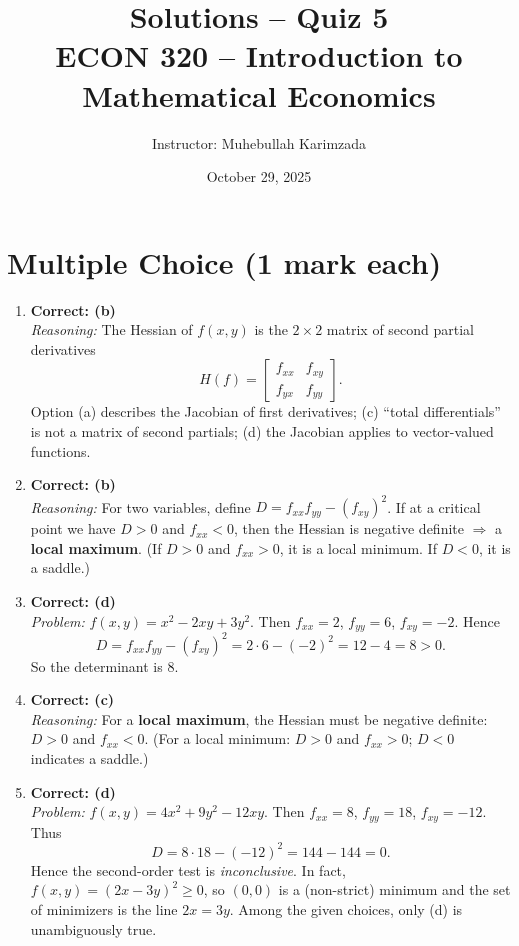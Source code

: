 \documentclass[12pt]{article}
\title{Solutions -- Quiz 5\\ \vspace{5pt}
\large ECON 320 -- Introduction to Mathematical Economics}
\author{Instructor: Muhebullah Karimzada}
\date{October 29, 2025}
\begin{document}
\maketitle

\section*{{ Multiple Choice (1 mark each)}}

\begin{enumerate}[leftmargin=*, label=\textbf{Q\arabic*.}]

\item \textbf{Correct: (b)} \\
\emph{Reasoning:} The Hessian of $f(x,y)$ is the $2\times 2$ matrix of second partial derivatives
\[
H(f)=
\begin{bmatrix}
f_{xx} & f_{xy}\\
f_{yx} & f_{yy}
\end{bmatrix}.
\]
Option (a) describes the Jacobian of first derivatives; (c) ``total differentials'' is not a matrix of second partials; (d) the Jacobian applies to vector-valued functions.

\item \textbf{Correct: (b)} \\
\emph{Reasoning:} For two variables, define $D=f_{xx}f_{yy}-(f_{xy})^2$. If at a critical point we have $D>0$ and $f_{xx}<0$, then the Hessian is negative definite $\Rightarrow$ a \textbf{local maximum}. (If $D>0$ and $f_{xx}>0$, it is a local minimum. If $D<0$, it is a saddle.)

\item \textbf{Correct: (d)} \\
\emph{Problem:} $f(x,y)=x^2-2xy+3y^2$. Then $f_{xx}=2$, $f_{yy}=6$, $f_{xy}=-2$. Hence
\[
D = f_{xx}f_{yy}-(f_{xy})^2 = 2\cdot 6 - (-2)^2 = 12-4=8>0.
\]
So the determinant is $8$.

\item \textbf{Correct: (c)} \\
\emph{Reasoning:} For a \textbf{local maximum}, the Hessian must be negative definite: $D>0$ and $f_{xx}<0$. (For a local minimum: $D>0$ and $f_{xx}>0$; $D<0$ indicates a saddle.)

\item \textbf{Correct: (d)} \\
\emph{Problem:} $f(x,y)=4x^2+9y^2-12xy$. Then $f_{xx}=8$, $f_{yy}=18$, $f_{xy}=-12$. Thus
\[
D=8\cdot 18-(-12)^2 = 144-144=0.
\]
Hence the second-order test is \emph{inconclusive}. In fact, $f(x,y)=(2x-3y)^2\ge 0$, so $(0,0)$ is a (non-strict) minimum and the set of minimizers is the line $2x=3y$. Among the given choices, only (d) is unambiguously true.

\end{enumerate}
\end{document}

